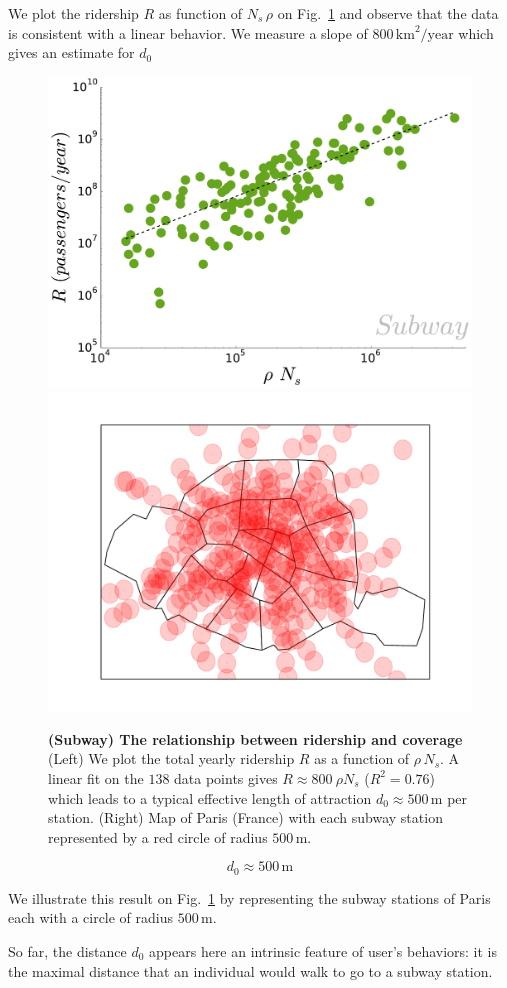  We plot the ridership $R$ as function of $N_s\,\rho$ on
 Fig.~\ref{fig:metro_ridership} and observe that the data is consistent with a
 linear behavior. We measure a slope of $800\, \text{km}^2/\text{year}$ which
 gives an estimate for $d_0$

\begin{figure}
\centering
    \includegraphics[width=.49\textwidth]{gfx/chapter-networks/metro_ridership_coverage.pdf}
    \includegraphics[width=.49\textwidth]{gfx/chapter-networks/paris_coverage.pdf}
    \caption{{\bf (Subway) The relationship between ridership and coverage} (Left)
    We plot the total yearly ridership $R$ as a function of $\rho\,N_s$. A linear
    fit on the $138$ data points gives $R \approx 800\:\rho N_s$ ($R^2=0.76$) which
    leads to a typical effective length of attraction $d_0 \approx 500\,\text{m}$
    per station. (Right) Map of Paris (France) with each subway station represented
    by a red circle of radius $500\,\text{m}$.\label{fig:metro_ridership}}
\end{figure}

\begin{equation}
    d_0 \approx 500\,\text{m}
\end{equation}

We illustrate this result on Fig.~\ref{fig:metro_ridership} by representing the
subway stations of Paris each with a circle of radius $500\,\text{m}$. 

So far, the distance $d_0$ appears here an intrinsic feature of user's
behaviors: it is the maximal distance that an individual would walk to go to a
subway station.


